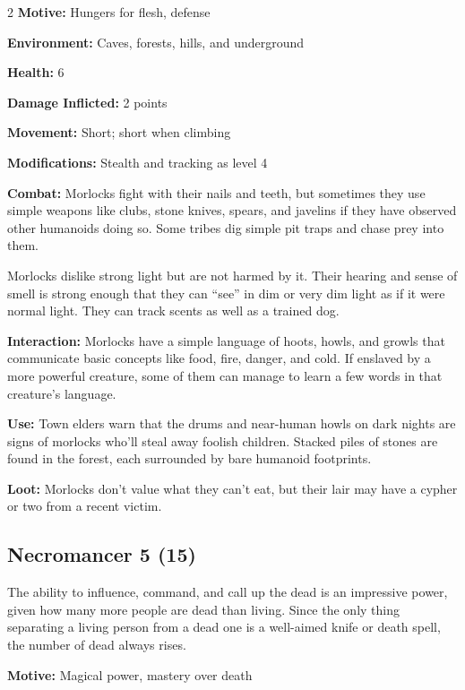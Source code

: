 \begin{multicols}{2}
\textbf{Motive:} Hungers for flesh, defense 

\textbf{Environment:} Caves, forests, hills, and underground 

\textbf{Health:} 6 

\textbf{Damage Inflicted:} 2 points 

\textbf{Movement:} Short; short when climbing 

\textbf{Modifications:} Stealth and tracking as level 4 

\textbf{Combat:} Morlocks fight with their nails and teeth, but sometimes they use simple weapons like clubs, stone knives, spears, and javelins if they have observed other humanoids doing so. Some tribes dig simple pit traps and chase prey into them. 

Morlocks dislike strong light but are not harmed by it. Their hearing and sense of smell is strong enough that they can “see” in dim or very dim light as if it were normal light. They can track scents as well as a trained dog. 

\textbf{Interaction:} Morlocks have a simple language of hoots, howls, and growls that communicate basic concepts like food, fire, danger, and cold. If enslaved by a more powerful creature, some of them can manage to learn a few words in that creature’s language. 

\textbf{Use:} Town elders warn that the drums and near-human howls on dark nights are signs of morlocks who’ll steal away foolish children. Stacked piles of stones are found in the forest, each surrounded by bare humanoid footprints. 

\textbf{Loot:} Morlocks don’t value what they can’t eat, but their lair may have a cypher or two from a recent victim.

\subsection{Necromancer 5 (15)}

The ability to influence, command, and call up the dead is an impressive power, given how many more people are dead than living. Since the only thing separating a living person from a dead one is a well-aimed knife or death spell, the number of dead always rises. 

\textbf{Motive:} Magical power, mastery over death 


\end{multicols}
